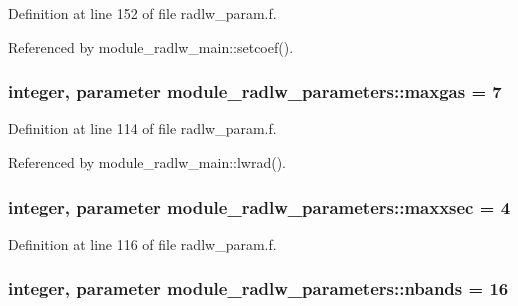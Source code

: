 Definition at line 152 of file radlw\+\_\+param.\+f.



Referenced by module\+\_\+radlw\+\_\+main\+::setcoef().

\subsubsection[{\texorpdfstring{maxgas}{maxgas}}]{\setlength{\rightskip}{0pt plus 5cm}integer, parameter module\+\_\+radlw\+\_\+parameters\+::maxgas = 7}\hypertarget{namespacemodule__radlw__parameters_a01330b4ad09907f2db51cb516ed21033}{}\label{namespacemodule__radlw__parameters_a01330b4ad09907f2db51cb516ed21033}


Definition at line 114 of file radlw\+\_\+param.\+f.



Referenced by module\+\_\+radlw\+\_\+main\+::lwrad().

\subsubsection[{\texorpdfstring{maxxsec}{maxxsec}}]{\setlength{\rightskip}{0pt plus 5cm}integer, parameter module\+\_\+radlw\+\_\+parameters\+::maxxsec = 4}\hypertarget{namespacemodule__radlw__parameters_a5817221936731c6ee6443da6a64e934e}{}\label{namespacemodule__radlw__parameters_a5817221936731c6ee6443da6a64e934e}


Definition at line 116 of file radlw\+\_\+param.\+f.

\subsubsection[{\texorpdfstring{nbands}{nbands}}]{\setlength{\rightskip}{0pt plus 5cm}integer, parameter module\+\_\+radlw\+\_\+parameters\+::nbands = 16}\hypertarget{namespacemodule__radlw__parameters_a48e11b992a80595d71c92f7c9bfbe19c}{}\label{namespacemodule__radlw__parameters_a48e11b992a80595d71c92f7c9bfbe19c}


